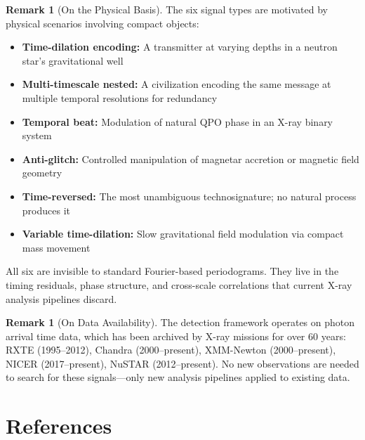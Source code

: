 \documentclass[11pt]{article}
\theoremstyle{definition}
\newtheorem{remark}[theorem]{Remark}
\begin{document}
\begin{remark}[On the Physical Basis]
The six signal types are motivated by physical scenarios involving compact objects:
\begin{itemize}[noitemsep]
\item \textbf{Time-dilation encoding:} A transmitter at varying depths in a neutron star's gravitational well
\item \textbf{Multi-timescale nested:} A civilization encoding the same message at multiple temporal resolutions for redundancy
\item \textbf{Temporal beat:} Modulation of natural QPO phase in an X-ray binary system
\item \textbf{Anti-glitch:} Controlled manipulation of magnetar accretion or magnetic field geometry
\item \textbf{Time-reversed:} The most unambiguous technosignature; no natural process produces it
\item \textbf{Variable time-dilation:} Slow gravitational field modulation via compact mass movement
\end{itemize}
All six are invisible to standard Fourier-based periodograms. They live in the timing residuals, phase structure, and cross-scale correlations that current X-ray analysis pipelines discard.
\end{remark}

\begin{remark}[On Data Availability]
The detection framework operates on photon arrival time data, which has been archived by X-ray missions for over 60 years: RXTE (1995--2012), Chandra (2000--present), XMM-Newton (2000--present), NICER (2017--present), NuSTAR (2012--present). No new observations are needed to search for these signals---only new analysis pipelines applied to existing data.
\end{remark}

\section*{References}
\end{document}
